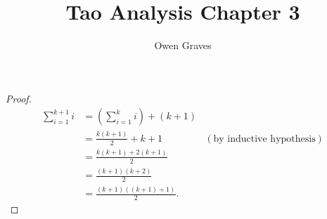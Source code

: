 \documentclass[12pt]{article}
\newenvironment{theorem}[2][Theorem]{\begin{trivlist}
\item[\hskip \labelsep {\bfseries #1}\hskip \labelsep {\bfseries #2}]}{\end{trivlist}}
\begin{document}
\title{Tao Analysis Chapter 3}
\author{Owen Graves}
\date{}
 
\maketitle
 
\begin{theorem}{}

\end{theorem}
 
\begin{proof}

\begin{align*}
\sum_{i=1}^{k+1}i & = \left(\sum_{i=1}^{k}i\right) +(k+1)\\ 
& = \frac{k(k+1)}{2}+k+1 & (\text{by inductive hypothesis})\\
& = \frac{k(k+1)+2(k+1)}{2}\\
& = \frac{(k+1)(k+2)}{2}\\
& = \frac{(k+1)((k+1)+1)}{2}.
\end{align*}
\end{proof}
\end{document}

